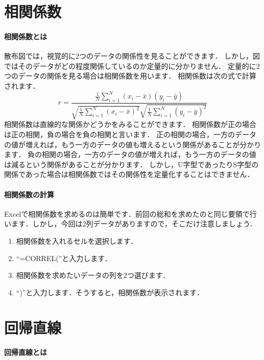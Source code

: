 \section{相関係数}

\paragraph{相関係数とは}

散布図では，視覚的に2つのデータの関係性を見ることができます．
しかし，図ではそのデータがどの程度関係しているのか定量的に分かりません．
定量的に2つのデータの関係を見る場合は相関係数を用います．
相関係数は次の式で計算されます．
\begin{equation}
    \label{eq:1}
    r = \frac{\frac{1}{N} \sum_{i=1}^N (x_i - \bar{x})(y_i - \bar{y})}{\sqrt{\frac{1}{N} \sum_{i=1}^N (x_i - \bar{x})^2} \sqrt{\frac{1}{N} \sum_{i=1}^N(y_i - \bar{y})^2}}
\end{equation}
相関係数は直線的な関係かどうかをみることができます．
相関係数が正の場合は正の相関，負の場合を負の相関と言います．
正の相関の場合，一方のデータの値が増えれば，もう一方のデータの値も増えるという関係があることが分かります．
負の相関の場合，一方のデータの値が増えれば，もう一方のデータの値は減るという関係があることが分かります．
しかし，U字型であったりS字型の関係であった場合は相関係数ではその関係性を定量化することはできません．


\paragraph{相関係数の計算}

Excelで相関係数を求めるのは簡単です．前回の総和を求めたのと同じ要領で行います．しかし，今回は2列データがありますので，そこだけ注意しましょう．

\begin{enumerate}
    \item 相関係数を入れるセルを選択します．
    \item ``=CORREL(''と入力します．
    \item 相関係数を求めたいデータの列を2つ選びます．
    \item ``)''と入力します．そうすると，相関係数が表示されます．
\end{enumerate}

\section{回帰直線}

\paragraph{回帰直線とは}

